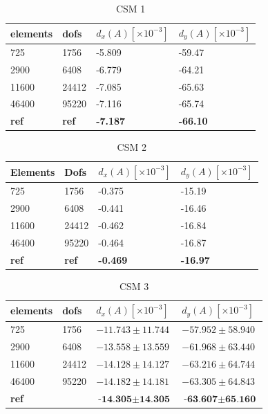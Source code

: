 \begin{table}[H]
\centering
\caption{CSM 1}
\label{my-label}
\begin{tabular}{|l|l|l|l|}
\hline
elements & dofs & $d_x(A) [\times10^{-3}]$ & $d_y(A) [\times10^{-3}]$ \\ \hline
725 & 1756 & -5.809 & -59.47 \\ \hline
2900 & 6408 & -6.779 & -64.21 \\ \hline
11600 & 24412 & -7.085 & -65.63 \\ \hline
46400 & 95220 & -7.116 & -65.74 \\ \hline
\textbf{ref} & \textbf{ref} & \textbf{-7.187} &  \textbf{-66.10} \\ \hline
\end{tabular}
\end{table}

\begin{table}[H]
\centering
\caption{CSM 2}
\label{my-label}
\begin{tabular}{@{}|l|l|l|l|@{}}
\hline
Elements & Dofs & $d_x(A) [\times10^{-3}] $& $d_y(A) [\times10^{-3}] $\\ \hline
725 &  1756 & -0.375 & -15.19 \\ \hline
2900 & 6408 & -0.441 & -16.46\\ \hline
11600 & 24412 & -0.462 & -16.84 \\ \hline
46400 & 95220 & -0.464 & -16.87\\ \hline
\textbf{ref} & \textbf{ref} &  \textbf{-0.469} &  \textbf{-16.97} \\ \hline
\end{tabular}
\end{table}

\begin{table}[H]
\centering
\caption{CSM 3}
\label{my-label}
\begin{tabular}{|l|l|l|l|}
\hline
elements & dofs & $d_x(A) [\times10^{-3}]$ & $d_y(A)[\times10^{-3}]$ \\ \hline
725 & 1756 & $-11.743 \pm 11.744$ & $-57.952 \pm 58.940$ \\ \hline
2900 & 6408 & $-13.558 \pm 13.559$ & $ -61.968 \pm  63.440 $ \\ \hline
11600 & 24412 & $ -14.128 \pm 14.127$ & $-63.216 \pm 64.744 $ \\ \hline
46400 & 95220 & $ -14.182 \pm 14.181 $ & $ -63.305 \pm 64.843 $ \\ \hline
\textbf{ref} &  & $ \textbf{-14.305} \pm \textbf{14.305} $ & $ \textbf{-63.607} \pm  \textbf{65.160} $ \\ \hline
\end{tabular}
\end{table}


